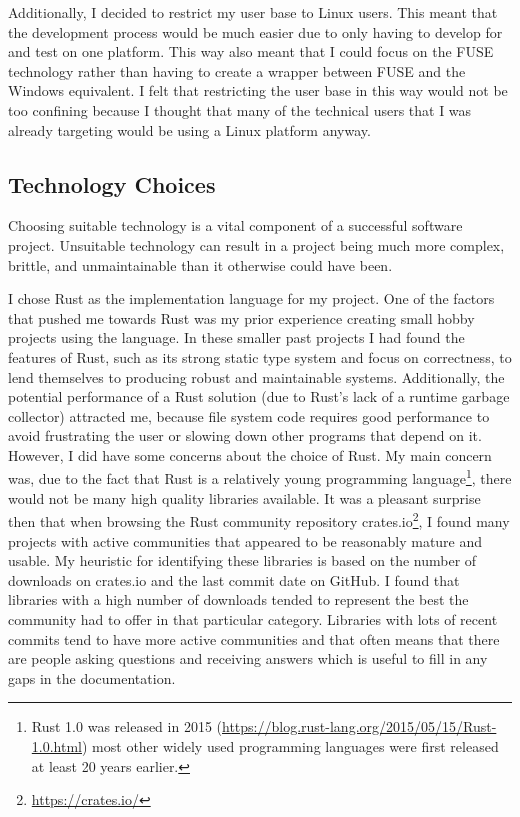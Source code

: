 Additionally, I decided to restrict my user base to Linux users. This meant
that the development process would be much easier due to only having to develop
for and test on one platform. This way also meant that I could focus on the
FUSE technology rather than having to create a wrapper between FUSE and the
Windows equivalent. I felt that restricting the user base in this way would not
be too confining because I thought that many of the technical users that I was
already targeting would be using a Linux platform anyway.

\subsection{Technology Choices}

Choosing suitable technology is a vital component of a successful software
project. Unsuitable technology can result in a project being much more complex,
brittle, and unmaintainable than it otherwise could have been. 

I chose Rust as the implementation language for my project. One of the factors
that pushed me towards Rust was my prior experience creating small hobby
projects using the language. In these smaller past projects I had found the
features of Rust, such as its strong static type system and focus on
correctness, to lend themselves to producing robust and maintainable systems.
Additionally, the potential performance of a Rust solution (due to Rust's lack
of a runtime garbage collector) attracted me, because file system code requires
good performance to avoid frustrating the user or slowing down other programs
that depend on it. However, I did have some concerns about the choice of Rust.
My main concern was, due to the fact that Rust is a relatively young
programming language\footnote{Rust 1.0 was released in 2015
(\url{https://blog.rust-lang.org/2015/05/15/Rust-1.0.html}) most other widely
used programming languages were first released at least 20 years earlier.},
there would not be many high quality libraries available. It was a pleasant
surprise then that when browsing the Rust community repository
crates.io\footnote{\url{https://crates.io/}}, I found many projects with active
communities that appeared to be reasonably mature and usable. My heuristic for
identifying these libraries is based on the number of downloads on crates.io
and the last commit date on GitHub. I found that libraries with a high number
of downloads tended to represent the best the community had to offer in that
particular category. Libraries with lots of recent commits tend to have more
active communities and that often means that there are people asking questions
and receiving answers which is useful to fill in any gaps in the documentation.

